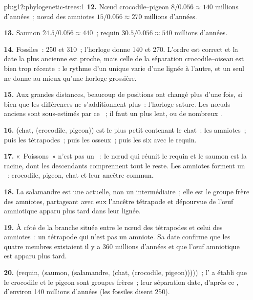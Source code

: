 \begin{solution}{pb:g12:phylogenetic-trees:1}
\textbf{12.} Nœud crocodile--pigeon $8/0.056 \approx 140$ millions
d'années~; nœud des amniotes $15/0.056 \approx 270$ millions d'années.

\textbf{13.} Saumon $24.5/0.056 \approx 440$~; requin $30.5/0.056
\approx 540$ millions d'années.

\textbf{14.} Fossiles~: 250 et 310~; l'horloge donne 140 et 270.
L'ordre est correct et la date la plus ancienne est proche, mais celle
de la séparation crocodile--oiseau est bien trop récente~: le rythme
d'un  unique varie d'une lignée à l'autre, et un seul  ne
donne au mieux qu'une horloge grossière.

\textbf{15.} Aux grandes distances, beaucoup de positions ont changé
plus d'une fois, si bien que les différences ne s'additionnent plus~:
l'horloge sature. Les nœuds anciens sont sous-estimés par ce ~; il
faut un  plus lent, ou de nombreux .

\textbf{16.} (chat, (crocodile, pigeon)) est le plus petit 
contenant le chat~: les amniotes~; puis les tétrapodes~; puis les
 osseux~; puis les six  avec le requin.

\textbf{17.} «~Poissons~» n'est pas un ~: le nœud qui réunit le
requin et le saumon est la racine, dont les descendants comprennent
tout le reste. Les amniotes forment un ~: crocodile, pigeon, chat
et leur ancêtre commun.

\textbf{18.} La salamandre est une  actuelle, non un
intermédiaire~; elle est le groupe frère des amniotes, partageant avec
eux l'ancêtre tétrapode et dépourvue de l'œuf amniotique apparu plus
tard dans leur lignée.

\textbf{19.} À côté de la branche située entre le nœud des tétrapodes
et celui des amniotes~: un tétrapode qui n'est pas un amniote. Sa date
confirme que les quatre membres existaient il y a 360 millions
d'années et que l'œuf amniotique est apparu plus tard.

\textbf{20.} (requin, (saumon, (salamandre, (chat, (crocodile,
pigeon)))))~; l' a établi que le crocodile et le pigeon sont
groupes frères~; leur séparation date, d'après ce , d'environ 140
millions d'années (les fossiles disent 250).
\end{solution}
